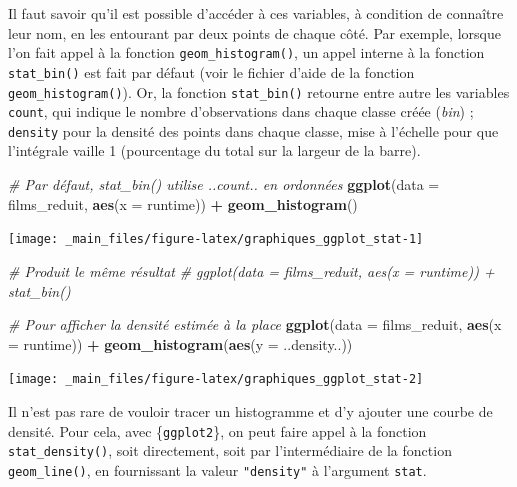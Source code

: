 \documentclass[
  11pt,
]{book}
\newenvironment{Shaded}{\begin{snugshade}}{\end{snugshade}}
\newcommand{\CommentTok}[1]{\textcolor[rgb]{0.56,0.35,0.01}{\textit{#1}}}
\newcommand{\DataTypeTok}[1]{\textcolor[rgb]{0.13,0.29,0.53}{#1}}
\newcommand{\KeywordTok}[1]{\textcolor[rgb]{0.13,0.29,0.53}{\textbf{#1}}}
\newcommand{\NormalTok}[1]{#1}
\newcommand{\OperatorTok}[1]{\textcolor[rgb]{0.81,0.36,0.00}{\textbf{#1}}}
\newcommand{\StringTok}[1]{\textcolor[rgb]{0.31,0.60,0.02}{#1}}
\numberwithin{equation}{section}
\numberwithin{countremarque}{section}
\begin{document}
Il faut savoir qu'il est possible d'accéder à ces variables, à condition de connaître leur nom, en les entourant par deux points de chaque côté. Par exemple, lorsque l'on fait appel à la fonction \texttt{geom\_histogram()}, un appel interne à la fonction \texttt{stat\_bin()} est fait par défaut (voir le fichier d'aide de la fonction \texttt{geom\_histogram()}). Or, la fonction \texttt{stat\_bin()} retourne entre autre les variables \texttt{count}, qui indique le nombre d'observations dans chaque classe créée (\emph{bin}) ; \texttt{density} pour la densité des points dans chaque classe, mise à l'échelle pour que l'intégrale vaille 1 (pourcentage du total sur la largeur de la barre).

\begin{Shaded}
\begin{Highlighting}[]
\CommentTok{\# Par défaut, stat\_bin() utilise ..count.. en ordonnées}
\KeywordTok{ggplot}\NormalTok{(}\DataTypeTok{data =}\NormalTok{ films\_reduit, }\KeywordTok{aes}\NormalTok{(}\DataTypeTok{x =}\NormalTok{ runtime)) }\OperatorTok{+}\StringTok{ }\KeywordTok{geom\_histogram}\NormalTok{()}
\end{Highlighting}
\end{Shaded}

\begin{center}\texttt{[image: \_main\_files/figure-latex/graphiques\_ggplot\_stat-1]} \end{center}

\begin{Shaded}
\begin{Highlighting}[]
\CommentTok{\# Produit le même résultat}
\CommentTok{\# ggplot(data = films\_reduit, aes(x = runtime)) + stat\_bin()}

\CommentTok{\# Pour afficher la densité estimée à la place}
\KeywordTok{ggplot}\NormalTok{(}\DataTypeTok{data =}\NormalTok{ films\_reduit, }\KeywordTok{aes}\NormalTok{(}\DataTypeTok{x =}\NormalTok{ runtime)) }\OperatorTok{+}
\StringTok{  }\KeywordTok{geom\_histogram}\NormalTok{(}\KeywordTok{aes}\NormalTok{(}\DataTypeTok{y =}\NormalTok{ ..density..))}
\end{Highlighting}
\end{Shaded}

\begin{center}\texttt{[image: \_main\_files/figure-latex/graphiques\_ggplot\_stat-2]} \end{center}

Il n'est pas rare de vouloir tracer un histogramme et d'y ajouter une courbe de densité. Pour cela, avec \{\texttt{ggplot2}\}, on peut faire appel à la fonction \texttt{stat\_density()}, soit directement, soit par l'intermédiaire de la fonction \texttt{geom\_line()}, en fournissant la valeur \texttt{"density"} à l'argument \texttt{stat}.
\end{document}
